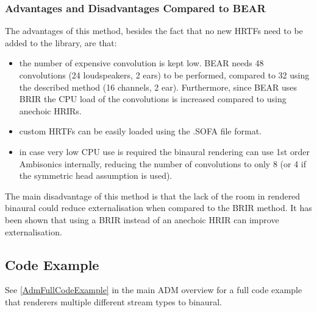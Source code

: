 \documentclass[12pt]{report}
\begin{document}
\subsubsection{Advantages and Disadvantages Compared to BEAR}

The advantages of this method, besides the fact that no new HRTFs need to be added to the library, are that:
\begin{itemize}
    \item the number of expensive convolution is kept low. BEAR needs 48 convolutions (24 loudspeakers, 2 ears) to be performed, compared to 32 using the described method (16 channels, 2 ear). Furthermore, since BEAR uses BRIR the CPU load of the convolutions is increased compared to using anechoic HRIRs.
    \item custom HRTFs can be easily loaded using the .SOFA file format.
    \item in case very low CPU use is required the binaural rendering can use 1st order Ambisonics internally, reducing the number of convolutions to only 8 (or 4 if the symmetric head assumption is used).
\end{itemize}

The main disadvantage of this method is that the lack of the room in rendered binaural could reduce externalisation when compared to the BRIR method. It has been shown that using a BRIR instead of an anechoic HRIR can improve externalisation.

\subsection{Code Example}

See \cref{AdmFullCodeExample} in the main ADM overview for a full code example that renderers multiple different stream types to binaural.

\medskip


\end{document}

